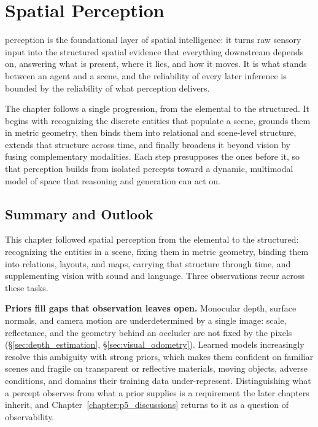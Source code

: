 
\chapter{Spatial Perception}
\label{chapter:3:sec:6}
\label{sec:perception}


 perception is the foundational layer of spatial intelligence: it turns raw sensory input into the structured spatial evidence that everything downstream depends on, answering what is present, where it lies, and how it moves. It is what stands between an agent and a scene, and the reliability of every later inference is bounded by the reliability of what perception delivers.

The chapter follows a single progression, from the elemental to the structured. It begins with recognizing the discrete entities that populate a scene, grounds them in metric geometry, then binds them into relational and scene-level structure, extends that structure across time, and finally broadens it beyond vision by fusing complementary modalities. Each step presupposes the ones before it, so that perception builds from isolated percepts toward a dynamic, multimodal model of space that reasoning and generation can act on.









\section{Summary and Outlook}
\label{sec:p3_s6_6}

This chapter followed spatial perception from the elemental to the structured: recognizing the entities in a scene, fixing them in metric geometry, binding them into relations, layouts, and maps, carrying that structure through time, and supplementing vision with sound and language. Three observations recur across these tasks.

\textbf{Priors fill gaps that observation leaves open.} Monocular depth, surface normals, and camera motion are underdetermined by a single image: scale, reflectance, and the geometry behind an occluder are not fixed by the pixels (§\ref{sec:depth_estimation}, §\ref{sec:visual_odometry}). Learned models increasingly resolve this ambiguity with strong priors, which makes them confident on familiar scenes and fragile on transparent or reflective materials, moving objects, adverse conditions, and domains their training data under-represent. Distinguishing what a percept observes from what a prior supplies is a requirement the later chapters inherit, and Chapter~\ref{chapter:p5_discussions} returns to it as a question of observability.

